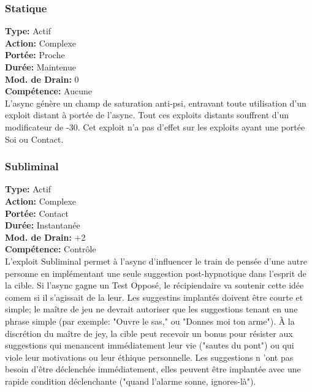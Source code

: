 \subsubsection{Statique} \textbf{Type:} Actif \\ \textbf{Action:} Complexe \\ \textbf{Portée:} Proche \\ \textbf{Durée:} Maintenue \\ \textbf{Mod. de Drain:} 0 \\ \textbf{Compétence:} Aucune\\ L'async génère un champ de saturation anti-psi, entravant toute utilisation d'un exploit distant à portée de l'async. Tout ces exploits distants souffrent d'un modificateur de -30. Cet exploit n'a pas d'effet sur les exploits ayant une portée Soi ou Contact. 

\subsubsection{Subliminal} \textbf{Type:} Actif \\ \textbf{Action:} Complexe \\ \textbf{Portée:} Contact \\ \textbf{Durée:} Instantanée \\ \textbf{Mod. de Drain:} +2 \\ \textbf{Compétence:} Contrôle \\ L'exploit Subliminal permet à l'async d'influencer le train de pensée d'une autre personne en implémentant une seule suggestion post-hypnotique dans l'esprit de la cible. Si l'async gagne un Test Opposé, le récipiendaire va soutenir cette idée comem si il s'agissait de la leur. Les suggestins implantés doivent être courte et simple; le maître de jeu ne devrait autoriser que les suggestions tenant en une phrase simple (par exemple: "Ouvre le sas," ou "Donnes moi ton arme"). À la discrétion du maître de jey, la cible peut recevoir un  bonus pour résister aux suggestions qui menancent immédiatement leur vie ("sautes du pont") ou qui viole leur motivations ou leur éthique personnelle. Les suggestions n 'ont pas besoin d'être déclenchée immédiatement, elles peuvent  être implantée avec une rapide condition déclenchante ("quand l'alarme sonne, ignores-là"). 

